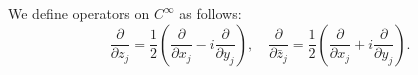 
We define operators on $C^\infty$ as follows:
$$\frac{\partial}{\partial z_j} = \frac{1}{2} \left( \frac{\partial}{\partial x_j} - i \frac{\partial}{\partial y_j} \right), \quad \frac{\partial}{\partial \bar{z}_j} = \frac{1}{2} \left( \frac{\partial}{\partial x_j} + i \frac{\partial}{\partial y_j} \right).$$
